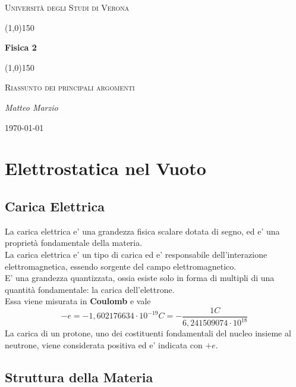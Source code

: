 \documentclass[a4paper, 10pt]{article}
\begin{document}
		\clearpage
	\begin{titlepage}
		\centering
		\vspace*{\fill}
		{\scshape\LARGE Università degli Studi di Verona \par}
		\vspace{1.5cm}
		\line(1,0){150} \\
		{\huge\bfseries Fisica 2\par}
		\line(1,0){150} \\
		\vspace{0.5cm}
		{\scshape\Large Riassunto dei principali argomenti\par}
		\vspace{2cm}
		{\Large\itshape Matteo Marzio\par}
		\vspace{1cm}
		\vspace{5cm}
		\vspace*{\fill}
		{\large \today\par}
	\end{titlepage}
	\thispagestyle{empty}
	\newpage
	\tableofcontents
	
	
	\newpage
	\section{Elettrostatica nel Vuoto}
		\subsection{Carica Elettrica}
			La carica elettrica e' una grandezza fisica scalare dotata di segno, ed e' una proprietà fondamentale della
			materia. \\
			La carica elettrica e' un tipo di carica ed e' responsabile dell'interazione elettromagnetica, essendo
			sorgente del campo elettromagnetico. \\
			E' una grandezza quantizzata, ossia esiste solo in forma di multipli di una quantità fondamentale: la carica
			dell'elettrone.\\ 
			Essa viene misurata in \textbf{Coulomb} e vale 
				\[ -e = -1,602176634 \cdot 10^{-19} C = - \frac{1C}{6,241509074 \cdot 10^{18}} \]
			La carica di un protone, uno dei costituenti fondamentali del nucleo insieme al neutrone, viene considerata
			positiva ed e' indicata con $+e$.
		\subsection{Struttura della Materia}
\end{document}
